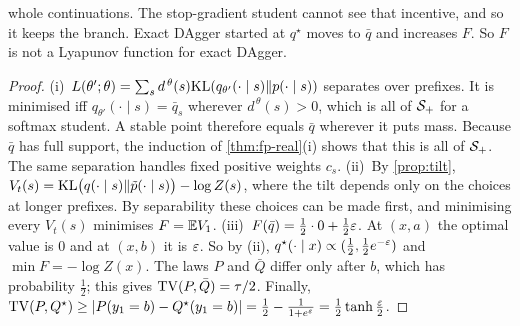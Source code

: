 whole continuations. The stop-gradient student cannot see that incentive, and so it keeps the branch. Exact DAgger started at
$q^\star$ moves to $\bar q$ and increases $F$. So $F$ is not a Lyapunov function for exact DAgger.
\begin{proof}
(i)~$L(\theta';\theta)=\sum_sd^{\,\theta}(s)\mathrm{KL}(q_{\theta'}(\cdot\mid s)\|p(\cdot\mid s))$ separates over prefixes. It is minimised iff $q_{\theta'}(\cdot\mid s)=\bar q_s$
wherever $d^{\,\theta}(s)>0$, which is all of $\mathcal{S}_+$ for a softmax student. A stable point therefore equals $\bar q$ wherever it
puts mass. Because $\bar q$ has full support, the induction of \cref{thm:fp-real}(i) shows that this is all of $\mathcal{S}_+$. The
same separation handles fixed positive weights $c_s$. (ii)~By \cref{prop:tilt},
$V_t(s)=\mathrm{KL}\big(q(\cdot\mid s)\|\tilde p(\cdot\mid s)\big)-\log Z(s)$, where the tilt depends only on the choices at longer prefixes. By separability
these choices can be made first, and minimising every $V_t(s)$ minimises $F=\mathbb{E} V_1$. (iii)~$F(\bar q)=\frac12\cdot0+\frac12\varepsilon$. At
$(x,a)$ the optimal value is $0$ and at $(x,b)$ it is $\varepsilon$. So by (ii), $q^\star(\cdot\mid x)\propto(\frac12,\frac12e^{-\varepsilon})$ and $\min F=-\log Z(x)$. The
laws $P$ and $\bar Q$ differ only after $b$, which has probability $\frac12$; this gives $\mathrm{TV}(P,\bar Q)=\tau/2$. Finally,
$\mathrm{TV}(P,Q^\star)\ge|P(y_1=b)-Q^\star(y_1=b)|=\frac12-\frac1{1+e^{\varepsilon}}=\frac12\tanh\frac{\varepsilon}2$.
\end{proof}

